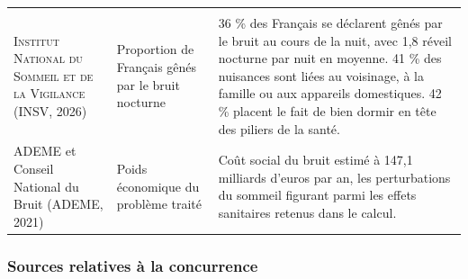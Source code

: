 \begin{center}
\begin{xltabular}{\textwidth}{P{3.4cm}P{3.6cm}L}
\toprule
{} &  &  \\
\midrule
\endfirsthead
\toprule
{} &  &  \\
\midrule
\endhead

\textsc{Institut National du Sommeil et de la Vigilance} (INSV, 2026)
&
Proportion de Français gênés par le bruit nocturne
&
36 \% des Français se déclarent gênés par le bruit au cours de la nuit, avec
1,8 réveil nocturne par nuit en moyenne. 41 \% des nuisances sont liées au
voisinage, à la famille ou aux appareils domestiques. 42 \% placent le fait de
bien dormir en tête des piliers de la santé. \\

\textsc{ADEME} et Conseil National du Bruit (ADEME, 2021)
&
Poids économique du problème traité
&
Coût social du bruit estimé à 147,1 milliards d'euros par an, les perturbations
du sommeil figurant parmi les effets sanitaires retenus dans le calcul. \\
\bottomrule
\end{xltabular}
\end{center}

\subsubsection{Sources relatives à la concurrence}

